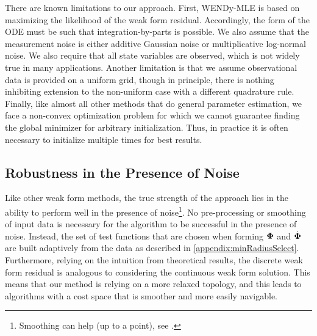 \setcounter{footnote}{1}
\setcounter{footnote}{2}
\setcounter{footnote}{3}
\setcounter{footnote}{4}

There are known limitations to our approach. First, WENDy-MLE is based on maximizing the likelihood of the weak form residual. Accordingly, the form of the ODE must be such that integration-by-parts is possible.  We also assume that the measurement noise is either additive Gaussian noise or multiplicative log-normal noise. We also require that all state variables are observed, which is not widely true in many applications. Another limitation is that we assume observational data is provided on a uniform grid, though in principle, there is nothing inhibiting extension to the non-uniform case with a different quadrature rule. Finally, like almost all other methods that do general parameter estimation, we face a non-convex optimization problem for which we cannot guarantee finding the global minimizer for arbitrary initialization. Thus, in practice it is often necessary to initialize multiple times for best results.

\subsection{Robustness in the Presence of Noise}
Like other weak form methods, the true strength of the approach lies in the ability to perform well in the presence of noise\footnote{Smoothing can help (up to a point), see \cite{MessengerBortz2024IMAJNumerAnal}.}. No pre-processing or smoothing of input data is necessary for the algorithm to be successful in the presence of noise. Instead, the set of test functions that are chosen when forming $\boldsymbol{\Phi}$ and $\dot{\boldsymbol{\Phi}}$ are built adaptively from the data as described in \ref{appendix:minRadiusSelect}. Furthermore, relying on the intuition from theoretical results, the discrete weak form residual is analogous to considering the continuous weak form solution. This means that our method is relying on a more relaxed topology, and this leads to algorithms with a cost space that is smoother and more easily navigable. 

